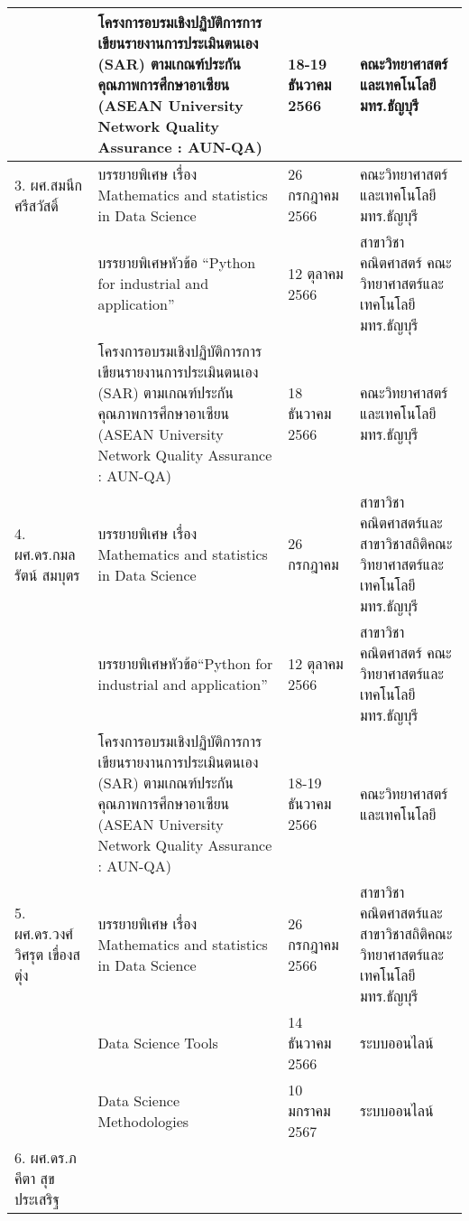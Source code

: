 \begin{longtable}{|p{}|>{\raggedright}p{}|>{\raggedright}p{}|p{}|}
&โครงการอบรมเชิงปฏิบัติการ\newline การเขียนรายงานการประเมินตนเอง (SAR) ตามเกณฑ์ประกันคุณภาพการศึกษาอาเซียน (ASEAN University Network Quality Assurance : AUN-QA)
&18-19 ธันวาคม 2566	
&คณะวิทยาศาสตร์และเทคโนโลยี มทร.ธัญบุรี\\
\hline
3. ผศ.สมนึก ศรีสวัสดิ์
&บรรยายพิเศษ เรื่อง Mathematics and statistics in Data Science
&26 กรกฎาคม 2566	
&คณะวิทยาศาสตร์และเทคโนโลยี มทร.ธัญบุรี\\
\cline{2-4}
&บรรยายพิเศษหัวข้อ “Python for industrial and application”	
&12 ตุลาคม 2566	
&สาขาวิชาคณิตศาสตร์ คณะวิทยาศาสตร์และเทคโนโลยี มทร.ธัญบุรี\\
\cline{2-4} 
&โครงการอบรมเชิงปฏิบัติการ\newline การเขียนรายงานการประเมินตนเอง (SAR) ตามเกณฑ์ประกันคุณภาพการศึกษาอาเซียน (ASEAN University Network Quality Assurance : AUN-QA)
&18 ธันวาคม 2566	
&คณะวิทยาศาสตร์และเทคโนโลยี มทร.ธัญบุรี\\ 
\hline
4. ผศ.ดร.กมลรัตน์ สมบุตร&บรรยายพิเศษ เรื่อง Mathematics and statistics in Data Science
& 26 กรกฎาคม\newline 2566                  
&สาขาวิชาคณิตศาสตร์และสาขาวิชาสถิติ\newline คณะวิทยาศาสตร์และเทคโนโลยี มทร.ธัญบุรี\\
\cline{2-4} 
&บรรยายพิเศษหัวข้อ\newline “Python for industrial and application”	
&12 ตุลาคม 2566	
&สาขาวิชาคณิตศาสตร์ คณะวิทยาศาสตร์และเทคโนโลยี มทร.ธัญบุรี\\ 
\cline{2-4}
&โครงการอบรมเชิงปฏิบัติการ\newline การเขียนรายงานการประเมินตนเอง (SAR) ตามเกณฑ์ประกันคุณภาพการศึกษาอาเซียน (ASEAN University Network Quality Assurance : AUN-QA)
&18-19 ธันวาคม 2566	
&คณะวิทยาศาสตร์และเทคโนโลยี\\ 
\hline
5. ผศ.ดร.วงศ์วิศรุต เขื่องสตุ่ง
&บรรยายพิเศษ เรื่อง Mathematics and statistics in Data Science
&26 กรกฎาคม 2566	
&สาขาวิชาคณิตศาสตร์และสาขาวิชาสถิติ\newline คณะวิทยาศาสตร์และเทคโนโลยี มทร.ธัญบุรี\\
\cline{2-4} 
&Data Science Tools	
&14 ธันวาคม 2566	
&ระบบออนไลน์\\             
\cline{2-4} &Data Science Methodologies	
&10 มกราคม 2567	
&ระบบออนไลน์\\             
\hline
6. ผศ.ดร.ภคีตา สุขประเสริฐ

\end{longtable}
